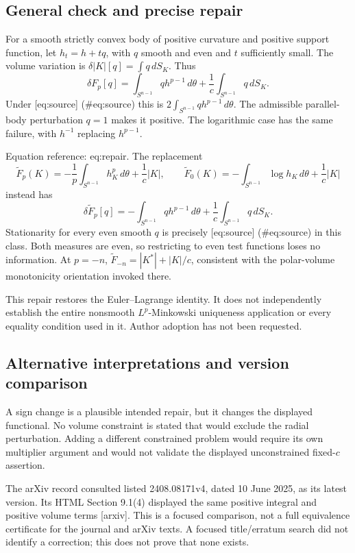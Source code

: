 \documentclass[10pt]{article}
\begin{document}
\subsection*{General check and precise repair}
For a smooth strictly convex body of positive curvature and positive support function, let \(h_t=h+tq\), with \(q\) smooth and even and \(t\) sufficiently small. The volume variation is \(\delta|K|[q]=\int q\,dS_K\). Thus \[\delta F_p[q]
 =\int_{S^{n-1}}q h^{p-1}\,d\theta+\frac1c\int_{S^{n-1}}q\,dS_K.\] Under [eq:source] (\#eq:source) this is \(2\int_{S^{n-1}}q h^{p-1}\,d\theta\). The admissible parallel-body perturbation \(q=1\) makes it positive. The logarithmic case has the same failure, with \(h^{-1}\) replacing \(h^{p-1}\).\par
Equation reference: eq:repair. The replacement \[\widetilde F_p(K)=-\frac1p\int_{S^{n-1}}h_K^p\,d\theta+\frac1c|K|,
 \qquad
 \widetilde F_0(K)=-\int_{S^{n-1}}\log h_K\,d\theta+\frac1c|K|
 \] instead has \[\delta\widetilde F_p[q]
 =-\int_{S^{n-1}}q h^{p-1}\,d\theta+\frac1c\int_{S^{n-1}}q\,dS_K .\] Stationarity for every even smooth \(q\) is precisely [eq:source] (\#eq:source) in this class. Both measures are even, so restricting to even test functions loses no information. At \(p=-n\), \(\widetilde F_{-n}=|K^\ast|+|K|/c\), consistent with the polar-volume monotonicity orientation invoked there.\par
This repair restores the Euler–Lagrange identity. It does not independently establish the entire nonsmooth \(L^p\)-Minkowski uniqueness application or every equality condition used in it. Author adoption has not been requested.\par
\subsection*{Alternative interpretations and version comparison}
A sign change is a plausible intended repair, but it changes the displayed functional. No volume constraint is stated that would exclude the radial perturbation. Adding a different constrained problem would require its own multiplier argument and would not validate the displayed unconstrained fixed-\(c\) assertion.\par
The arXiv record consulted listed 2408.08171v4, dated 10 June 2025, as its latest version. Its HTML Section 9.1(4) displayed the same positive integral and positive volume terms [arxiv]. This is a focused comparison, not a full equivalence certificate for the journal and arXiv texts. A focused title/erratum search did not identify a correction; this does not prove that none exists.\par
\end{document}
